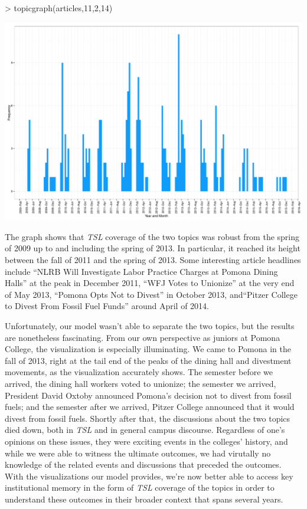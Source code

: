 \documentclass[a4paper]{article}
\begin{document}
\begin{Schunk}
\begin{Sinput}
> topicgraph(articles,11,2,14)
\end{Sinput}
\end{Schunk}
\includegraphics{FinalProject-007}

The graph shows that \textit{TSL} coverage of the two topics was robust from the spring of 2009 up to and including the spring of 2013. In particular, it reached its height between the fall of 2011 and the spring of 2013. Some interesting article headlines include ``NLRB Will Investigate Labor Practice Charges at Pomona Dining Halls'' at the peak in December 2011, ``WFJ Votes to Unionize'' at the very end of May 2013, ``Pomona Opts Not to Divest'' in October 2013, and``Pitzer College to Divest From Fossil Fuel Funds'' around April of 2014.

Unfortunately, our model wasn't able to separate the two topics, but the results are nonetheless fascinating. From our own perspective as juniors at Pomona College, the visualization is especially illuminating. We came to Pomona in the fall of 2013, right at the tail end of the peaks of the dining hall and divestment movements, as the visualization accurately shows. The semester before we arrived, the dining hall workers voted to unionize; the semester we arrived, President David Oxtoby announced Pomona's decision not to divest from fossil fuels; and the semester after we arrived, Pitzer College announced that it would divest from fossil fuels. Shortly after that, the discussions about the two topics died down, both in \textit{TSL} and in general campus discourse. Regardless of one's opinions on these issues, they were exciting events in the colleges' history, and while we were able to witness the ultimate outcomes, we had virutally no knowledge of the related events and discussions that preceded the outcomes. With the visualizations our model provides, we're now better able to access key institutional memory in the form of \textit{TSL} coverage of the topics in order to understand these outcomes in their broader context that spans several years.
\end{document}
